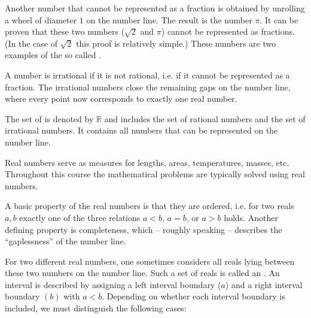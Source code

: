 \begin{MIntro}
\vspace*{5mm}

Another number that cannot be represented as a fraction is obtained by unrolling a wheel of diameter $1$ 
on the number line. The result is the number $\pi$. It can be proven that these two numbers ($\sqrt{2}$ and $\pi$)
cannot be represented as fractions. (In the case of $\sqrt{2}$ this proof is relatively simple.) These numbers are two 
examples of the so called .

\vspace*{5mm}

\begin{center}
\end{center}

A number is irrational if it is not rational, i.e. if it cannot be represented as a fraction.
The irrational numbers close the remaining gaps on the number line, where every point now
corresponds to exactly one real number. 

\begin{MInfo}
The set of  is denoted by $\mathbb{R}$ and includes the set of rational 
numbers and the set of irrational numbers. It contains all numbers that can be represented on the number line.
\end{MInfo}

Real numbers serve as measures for lengths, areas, temperatures, masses, etc. Throughout this course 
the mathematical problems are typically solved using real numbers.

A basic property of the real numbers is that they are ordered, i.e. for two reals $a,b$ exactly one of
the three relations $a<b$, $a=b$, or $a>b$ holds. Another defining property is completeness, which -- 
roughly speaking -- describes the ``gaplessness'' of the number line.

\begin{MInfo}
For two different real numbers, one sometimes considers all reals lying between these two 
numbers on the number line. Such a set of reals is called an .
An interval is described by assigning a left interval boundary ($a$) and a right 
interval boundary $(b)$ with $a<b$. Depending on whether each interval boundary is included, we must distinguish the following cases:



\end{MInfo}
\end{MIntro}
